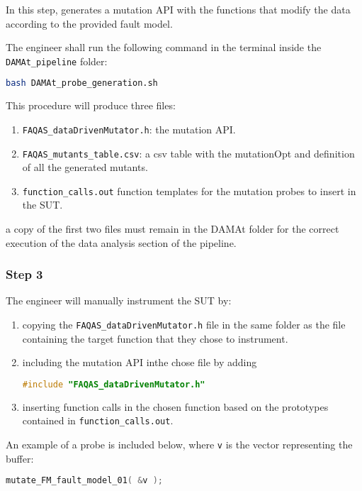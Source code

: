 In this step, \DAMA generates a mutation API with the functions that modify the data according to the provided fault model.

The engineer shall run the following command in the terminal inside the \texttt{DAMAt\_pipeline} folder:

\begin{lstlisting}[language=bash]
bash DAMAt_probe_generation.sh
\end{lstlisting}

This procedure will produce three files:

\begin{enumerate}
	\item \texttt{FAQAS\_dataDrivenMutator.h}: the mutation API.
	\item \texttt{FAQAS\_mutants\_table.csv}: a csv table with the mutationOpt and definition of all the generated mutants.
	\item \texttt{function\_calls.out} function templates for the mutation probes to insert in the SUT.
\end{enumerate}

a copy of the first two files must remain in the DAMAt folder for the correct execution of the data analysis section of the pipeline.

\subsubsection{Step 3}
The engineer will manually instrument the SUT by:

\begin{enumerate}
	\item copying the \texttt{FAQAS\_dataDrivenMutator.h} file in the same folder as the file containing the target function that they chose to instrument.
	\item including the mutation API inthe chose file by adding
	\begin{lstlisting}[language=c]
	#include "FAQAS_dataDrivenMutator.h"
	\end{lstlisting}
	\item inserting function calls in the chosen function based on the prototypes contained in \texttt{function\_calls.out}.
\end{enumerate}

An example of a probe is included below, where \texttt{v} is the vector representing the buffer:
\begin{lstlisting}[language=c]
mutate_FM_fault_model_01( &v );
\end{lstlisting}

